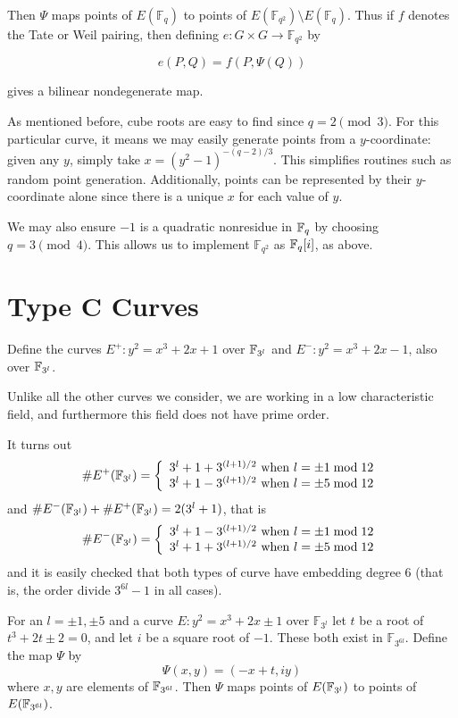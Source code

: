 Then $\Psi$ maps points of $E(\mathbb{F}_q)$ to points of
$E(\mathbb{F}_{q^2}) \setminus E(\mathbb{F}_q)$. Thus if $f$ denotes the
Tate or Weil pairing, then defining $e:G \times G \rightarrow \mathbb{F}_{q^2}$
by

\[ e(P,Q) = f(P, \Psi(Q)) \]

gives a bilinear nondegenerate map.

As mentioned before, cube roots are easy to find since $q = 2 \pmod{3}$.
For this particular curve, it means we may easily generate points from
a $y$-coordinate: given any $y$, simply take $x = (y^2-1)^{-(q-2)/3}$.
This simplifies routines such as random point generation. Additionally,
points can be represented by their $y$-coordinate alone since there is
a unique $x$ for each value of $y$.

We may also ensure $-1$ is a quadratic nonresidue in $\mathbb{F}_q$ by
choosing $q = 3\pmod{4}$. This allows us to implement $\mathbb{F}_{q^2}$
as $\mathbb{F}_q[i]$, as above.

\section {Type C Curves}

Define the curves $E^{+} : y^2 = x^3 + 2 x + 1$ over $\mathbb{F}_{3^l}$
and $E^{-} : y^2 = x^3 + 2 x - 1$, also over $\mathbb{F}_{3^l}$.

Unlike all the other curves we consider,
we are working in a low characteristic field, and furthermore this
field does not have prime order.

It turns out
\[
\#E^+(\mathbb{F}_{3^l}) = \left \{ \begin{array}{rcl}
3^l + 1 + 3^{(l+1)/2} \mbox { when } l = \pm 1 \bmod 12 \\
3^l + 1 - 3^{(l+1)/2} \mbox { when } l = \pm 5 \bmod 12
\end{array} \right.
\]
and $\#E^-(\mathbb{F}_{3^l}) + \#E^+(\mathbb{F}_{3^l}) = 2(3^l + 1)$, that is
\[
\#E^-(\mathbb{F}_{3^l}) = \left \{ \begin{array}{rcl}
3^l + 1 - 3^{(l+1)/2} \mbox { when } l = \pm 1 \bmod 12 \\
3^l + 1 + 3^{(l+1)/2} \mbox { when } l = \pm 5 \bmod 12
\end{array} \right.
\]
and it is easily checked that both types of curve have embedding
degree 6 (that is, the order divide $3^{6l} -1$ in all cases).

For an $l = \pm 1, \pm 5$ and a
curve $E : y^2 = x^3 + 2 x \pm 1$ over $\mathbb{F}_{3^l}$
let $t$ be a root of $t^3 + 2t \pm 2 = 0$, and let $i$ be a
square root of $-1$. These both exist in $\mathbb{F}_{3^{6l}}$.
Define the map $\Psi$ by
\[ \Psi(x,y) = (-x + t, i y) \]
where $x, y$ are elements of $\mathbb{F}_{3^{6l}}$. Then $\Psi$ maps points
of $E(\mathbb{F}_{3^l})$ to points of $E(\mathbb{F}_{3^{6l}})$.

